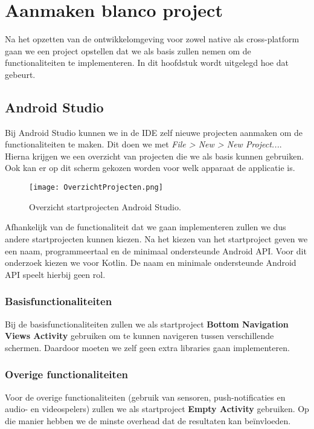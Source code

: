 
\chapter{Aanmaken blanco project}%
\label{ch:projecten}

Na het opzetten van de ontwikkelomgeving voor zowel native als cross-platform gaan 
we een project opstellen dat we als basis zullen nemen om de functionaliteiten te 
implementeren. In dit hoofdstuk wordt uitgelegd hoe dat gebeurt.

\section{Android Studio}
Bij Android Studio kunnen we in de IDE zelf nieuwe projecten aanmaken om de 
functionaliteiten te maken. Dit doen we met \textit{File > New > New Project...}. 
Hierna krijgen we een overzicht van projecten die we als basis kunnen gebruiken. Ook 
kan er op dit scherm gekozen worden voor welk apparaat de applicatie is.
\begin{figure}[H]
    \centering
    \texttt{[image: OverzichtProjecten.png]}
    \caption{Overzicht startprojecten Android Studio.}
\end{figure}
Afhankelijk van de functionaliteit dat we gaan implementeren zullen we dus andere 
startprojecten kunnen kiezen. Na het kiezen van het startproject geven we een naam, 
programmeertaal en de minimaal ondersteunde Android API. Voor dit onderzoek kiezen we 
voor Kotlin. De naam en minimale ondersteunde Android API speelt hierbij geen rol.

\subsection{Basisfunctionaliteiten}
\label{par:basisfunctionaliteiten}
Bij de basisfunctionaliteiten zullen we als startproject 
\textbf{Bottom Navigation Views Activity} gebruiken om te kunnen navigeren tussen 
verschillende schermen. Daardoor moeten we zelf geen extra libraries gaan implementeren.

\subsection{Overige functionaliteiten}
Voor de overige functionaliteiten (gebruik van sensoren, 
push-notificaties en audio- en videospelers) zullen we als startproject 
\textbf{Empty Activity} gebruiken. Op die manier hebben we de minste \gls{overhead} 
dat de resultaten kan beïnvloeden.

